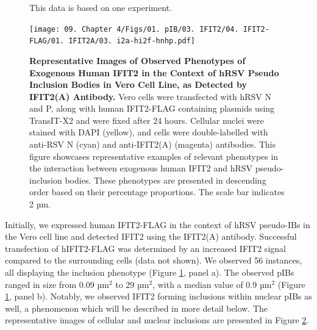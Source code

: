 \begin{figure}
{This data is based on one experiment.}
    \label{fig:Observed Phenotypes of Exogenous Human IFIT2 in the Context of hRSV Pseudo Inclusion Bodies in Vero Cell Line, as Detected by IFIT2(A) Antibody}
\end{figure}

\begin{figure}
    \centering
    \texttt{[image: 09. Chapter 4/Figs/01. pIB/03. IFIT2/04. IFIT2-FLAG/01. IFIT2A/03. i2a-hi2f-hnhp.pdf]}
    \caption[Representative Images of Observed Phenotypes of Exogenous Human IFIT2 in the Context of hRSV Pseudo Inclusion Bodies in Vero Cell Line, as Detected by IFIT2(A) Antibody.]{\textbf{Representative Images of Observed Phenotypes of Exogenous Human IFIT2 in the Context of hRSV Pseudo Inclusion Bodies in Vero Cell Line, as Detected by IFIT2(A) Antibody.} Vero cells were transfected with hRSV N and P, along with human IFIT2-FLAG containing plasmids using TransIT-X2 and were fixed after 24 hours. Cellular nuclei were stained with DAPI (yellow), and cells were double-labelled with anti-RSV N (cyan) and anti-IFIT2(A) (magenta) antibodies. This figure showcases representative examples of relevant phenotypes in the interaction between exogenous human IFIT2 and hRSV pseudo-inclusion bodies. These phenotypes are presented in descending order based on their percentage proportions. The scale bar indicates 2 µm.}
    \label{fig:Representative Images of Observed Phenotypes of Exogenous Human IFIT2 in the Context of hRSV Pseudo Inclusion Bodies in Vero Cell Line, as Detected by IFIT2(A) Antibody}
\end{figure}

Initially, we expressed human IFIT2-FLAG in the context of hRSV pseudo-IBs in the Vero cell line and detected IFIT2 using the IFIT2(A) antibody. Successful transfection of hIFIT2-FLAG was determined by an increased IFIT2 signal compared to the surrounding cells (data not shown). We observed 56 instances, all displaying the inclusion phenotype (Figure \ref{fig:Observed Phenotypes of Exogenous Human IFIT2 in the Context of hRSV Pseudo Inclusion Bodies in Vero Cell Line, as Detected by IFIT2(A) Antibody}, panel a). The observed pIBs ranged in size from 0.09 \(\mbox{µm}^2\) to 29 \(\mbox{µm}^2\), with a median value of 0.9 \(\mbox{µm}^2\) (Figure \ref{fig:Observed Phenotypes of Exogenous Human IFIT2 in the Context of hRSV Pseudo Inclusion Bodies in Vero Cell Line, as Detected by IFIT2(A) Antibody}, panel b). Notably, we observed IFIT2 forming inclusions within nuclear pIBs as well, a phenomenon which will be described in more detail below. The representative images of cellular and nuclear inclusions are presented in Figure \ref{fig:Representative Images of Observed Phenotypes of Exogenous Human IFIT2 in the Context of hRSV Pseudo Inclusion Bodies in Vero Cell Line, as Detected by IFIT2(A) Antibody}.

